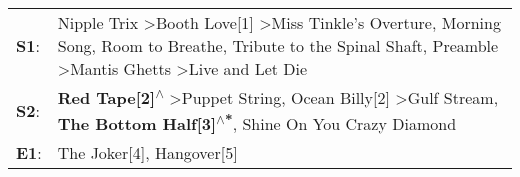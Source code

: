 \begin{supertabular}{p{0.03\textwidth}p{0.92\textwidth}}
 \textbf{S1}:  &  Nipple Trix\textsuperscript{} \textgreater \enspace Booth Love[1]\textsuperscript{} \textgreater \enspace Miss Tinkle's Overture\textsuperscript{}, \enspace Morning Song\textsuperscript{}, \enspace Room to Breathe\textsuperscript{}, \enspace Tribute to the Spinal Shaft\textsuperscript{}, \enspace Preamble\textsuperscript{} \textgreater \enspace Mantis Ghetts\textsuperscript{} \textgreater \enspace Live and Let Die\textsuperscript{}  \enspace  \\
 \textbf{S2}:  &                                                                                                                          \textbf{Red Tape[2]\textsuperscript{$\wedge$}} \textgreater \enspace Puppet String\textsuperscript{}, \enspace Ocean Billy[2]\textsuperscript{} \textgreater \enspace Gulf Stream\textsuperscript{}, \enspace \textbf{The Bottom Half[3]\textsuperscript{$\wedge$*}}, \enspace Shine On You Crazy Diamond\textsuperscript{}  \enspace  \\
 \textbf{E1}:  &                                                                                                                                                                                                                                                                                                                                                                               The Joker[4]\textsuperscript{}, \enspace Hangover[5]\textsuperscript{}  \enspace  \\
\end{supertabular}
